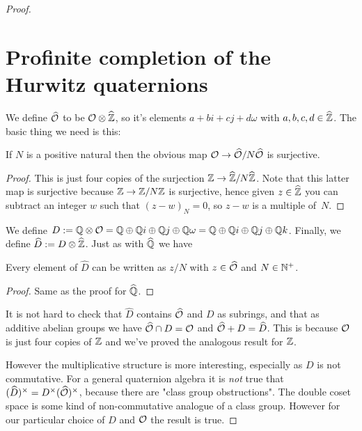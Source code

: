 \begin{proof}
\section{Profinite completion of the Hurwitz quaternions}

We define $\widehat{\mathcal{O}}$ to be $\mathcal{O}\otimes\widehat{\mathbb{Z}}$, so it's elements $a+bi+cj+d\omega$
with $a,b,c,d\in\widehat{\mathbb{Z}}$. The basic thing we need is this:

\begin{theorem}
    \label{Hurwitz.surjective_pnat_quotient}
    If $N$ is a positive natural then the obvious map $\mathcal{O}\to\widehat{\mathcal{O}}/N\widehat{\mathcal{O}}$ is surjective.
\end{theorem}
\begin{proof}
    This is just four copies of the surjection $\mathbb{Z}\to\widehat{\mathbb{Z}}/N\widehat{\mathbb{Z}}$.
    Note that this latter map is surjective because $\mathbb{Z}\to\mathbb{Z}/N\mathbb{Z}$ is surjective,
    hence given $z\in\widehat{\mathbb{Z}}$ you can subtract an integer $w$ such
    that $(z-w)_N=0$, so $z-w$ is a multiple of~$N$.
\end{proof}

We define $D:=\mathbb{Q}\otimes\mathcal{O}=\mathbb{Q}\oplus\mathbb{Q} i\oplus\mathbb{Q} j\oplus\mathbb{Q}\omega=\mathbb{Q}\oplus\mathbb{Q} i\oplus\mathbb{Q} j\oplus\mathbb{Q} k$.
Finally, we define $\widehat{D}:=D\otimes\widehat{\mathbb{Z}}$. Just as with $\widehat{\mathbb{Q}}$ we have

\begin{lemma}
    \label{Hurwitz.canonicalForm}
    \leanok
    Every element of $\widehat{D}$ can be written as $z/N$ with $z\in\widehat{\mathcal{O}}$ and $N\in\mathbb{N}^+$.
\end{lemma}
\begin{proof}
    Same as the proof for $\widehat{\mathbb{Q}}$.
\end{proof}

It is not hard to check that $\widehat{D}$ contains $\widehat{\mathcal{O}}$
and $D$ as subrings, and that as additive abelian groups we have
$\widehat{\mathcal{O}}\cap D=\mathcal{O}$ and $\widehat{\mathcal{O}}+D=\widehat{D}$.
This is because $\mathcal{O}$ is just four copies of $\mathbb{Z}$ and we've proved
the analogous result for $\mathbb{Z}$.

However the multiplicative structure is more interesting, especially
as $D$ is not commutative. For a general quaternion algebra it is \emph{not}
true that $(\widehat{D})^\times=D^\times(\widehat{\mathcal{O}})^\times$, because
there are "class group obstructions". The double coset space is some
kind of non-commutative analogue of a class group. However for our
particular choice of $D$ and $\mathcal{O}$ the result is true.


\end{proof}
